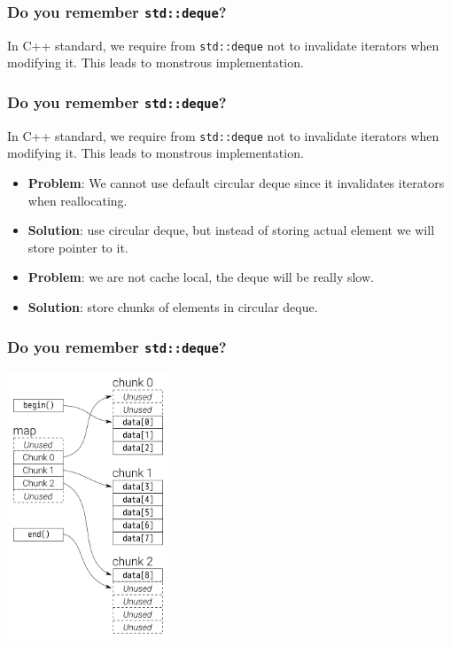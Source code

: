 \documentclass[aspectratio=1610,t]{beamer}
\begin{document}

\begin{frame}[fragile]
\frametitle{Do you remember \texttt{std::deque}?}
In C++ standard, we require from \texttt{std::deque} not to invalidate iterators when modifying it. This leads to monstrous implementation.

\end{frame}


\begin{frame}[fragile]
\frametitle{Do you remember \texttt{std::deque}?}
In C++ standard, we require from \texttt{std::deque} not to invalidate iterators when modifying it. This leads to monstrous implementation.

\begin{itemize}
    \item<1-> \textbf{Problem}: We cannot use default circular deque since it invalidates iterators when reallocating.
    \item<2-> \textbf{Solution}: use circular deque, but instead of storing actual element we will store pointer to it.
    \item<3-> \textbf{Problem}: we are not cache local, the deque will be really slow.
    \item<4-> \textbf{Solution}: store chunks of elements in circular deque.
\end{itemize}
\end{frame}


\begin{frame}[fragile]
\frametitle{Do you remember \texttt{std::deque}?}

\center\includegraphics[height=8cm,keepaspectratio]{images/std-deque.png}

\end{frame}
\end{document}
